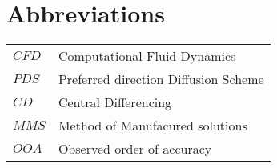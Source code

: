 \section*{Abbreviations}
\noindent
\begin{tabularx}{\linewidth}{@{} l X @{}}
$CFD$  & Computational Fluid Dynamics \\
$PDS$  &  Preferred direction Diffusion Scheme \\
$CD$  &  Central Differencing \\
$MMS$ & Method of Manufacured solutions\\
$OOA$ & Observed order of accuracy\\



\end{tabularx}



\makenomenclature
\newpage
\let\cleardoublepage\clearpage			%
\thispagestyle{empty}
\mbox{}